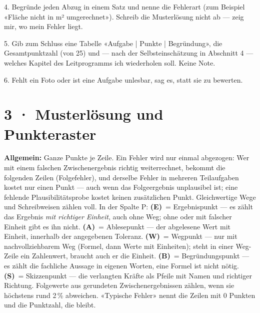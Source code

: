 \documentclass[11pt]{article}
\begin{document}
\begin{tcolorbox}[breakable,colback=lplinie!25,colframe=lplinie,boxrule=0.5pt,arc=1mm,fontupper=\small]
4. Begründe jeden Abzug in einem Satz und nenne die Fehlerart (zum Beispiel «Fläche nicht in m² umgerechnet»). Schreib die Musterlösung nicht ab — zeig mir, wo mein Fehler liegt.\par
5. Gib zum Schluss eine Tabelle «Aufgabe | Punkte | Begründung», die Gesamtpunktzahl (von 25) und — nach der Selbsteinschätzung in Abschnitt 4 — welches Kapitel des Leitprogramms ich wiederholen soll. Keine Note.\par
6. Fehlt ein Foto oder ist eine Aufgabe unlesbar, sag es, statt sie zu bewerten.
\end{tcolorbox}

\section*{3 · Musterlösung und Punkteraster}
\textbf{Allgemein:} Ganze Punkte je Zeile. Ein Fehler wird nur einmal abgezogen: Wer mit einem falschen Zwischenergebnis
richtig weiterrechnet, bekommt die folgenden Zeilen (Folgefehler), und derselbe Fehler in mehreren Teilaufgaben kostet nur einen Punkt — auch wenn das Folgeergebnis unplausibel ist; eine fehlende
Plausibilitätsprobe kostet keinen zusätzlichen Punkt. Gleichwertige Wege und Schreibweisen zählen voll.
In der Spalte P: \textbf{(E)}~= Ergebnispunkt — es zählt das Ergebnis \emph{mit richtiger Einheit}, auch ohne Weg; ohne oder mit
falscher Einheit gibt es ihn nicht. \textbf{(A)}~= Ablesepunkt — der abgelesene Wert mit Einheit, innerhalb der angegebenen Toleranz. \textbf{(W)}~= Wegpunkt — nur mit nachvollziehbarem Weg (Formel, dann Werte mit Einheiten);
steht in einer Weg-Zeile ein Zahlenwert, braucht auch er die Einheit. \textbf{(B)}~= Begründungspunkt — es zählt die fachliche
Aussage in eigenen Worten, eine Formel ist nicht nötig. \textbf{(S)}~= Skizzenpunkt — die verlangten Kräfte als Pfeile mit Namen
und richtiger Richtung. Folgewerte aus gerundeten Zwischenergebnissen zählen, wenn sie höchstens rund 2\,\% abweichen.
«Typische Fehler» nennt die Zeilen mit 0 Punkten und die Punktzahl, die bleibt.
\end{document}
